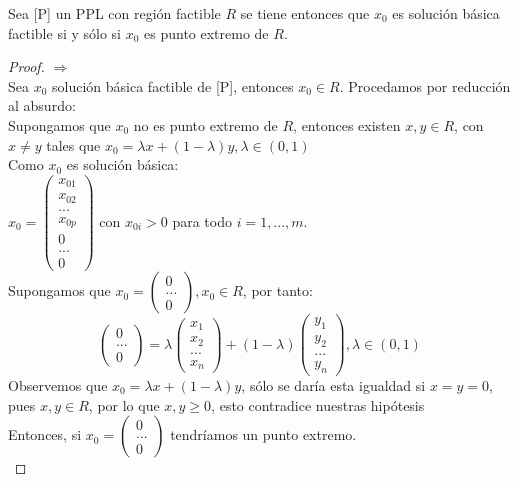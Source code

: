 \documentclass[11pt,fleqn]{book} %
\begin{document}
\begin{theorem}
	Sea [P] un PPL con región factible $R$ se tiene entonces que $x_0$ es solución básica factible si y sólo si $x_0$ es punto extremo de $R$.
\end{theorem}
\begin{proof}
	$\Rightarrow$ \\
	Sea $x_0$ solución básica factible de [P], entonces $x_0 \in R$. Procedamos por reducción al absurdo: \\
	Supongamos que $x_0$ no es punto extremo de $R$, entonces existen $x, y \in R$, con $x \neq y$ tales que $x_0 = \lambda x + (1-\lambda)y, \lambda \in (0, 1)$ \\
	Como $x_0$ es solución básica: \\
	$x_0=\left(\begin{array}{c}
	x_{01} \\
	x_{02} \\
	... \\
	x_{0p} \\
	0 \\
	... \\
	0
	\end{array}\right)$ con $x_{0i} > 0$ para todo $i=1,...,m$. \\
	Supongamos que	$x_0=\left(\begin{array}{c}
	0 \\
	... \\
	0
	\end{array}\right), x_0 \in R$, por tanto: 
	$$
		\left(\begin{array}{c}
		0 \\
		... \\
		0
		\end{array}\right)=\lambda \left(\begin{array}{c}
		x_1 \\
		x_2 \\
		... \\
		x_n
		\end{array}\right)+(1-\lambda)\left(\begin{array}{c}
		y_1 \\
		y_2 \\
		... \\
		y_n
		\end{array}\right), \lambda \in (0, 1)
	$$
	Observemos que $x_0=\lambda x + (1-\lambda )y$, sólo se daría esta igualdad si $x=y=0$, pues $x, y \in R$, por lo que $x, y \geq 0$, esto contradice nuestras hipótesis \\
	Entonces, si $x_0=\left(\begin{array}{c}
	0 \\
	... \\
	0
	\end{array}\right)$ tendríamos un punto extremo. \\
	

\end{proof}
\end{document}
